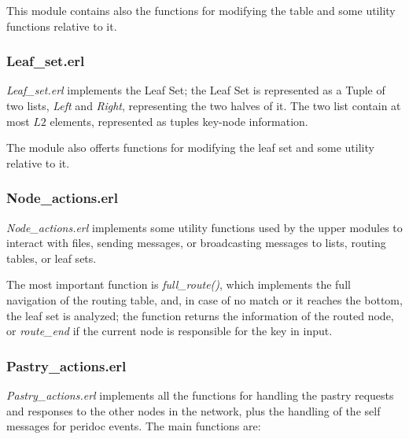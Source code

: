 \documentclass{article}
\begin{document}
This module contains also the functions for modifying the table and some utility functions relative to it.

\subsubsection{Leaf\_set.erl}

\textit{Leaf\_set.erl} implements the Leaf Set; the Leaf Set is represented as a Tuple of two lists, 
\textit{Left} and \textit{Right}, representing the two halves of it. The two list contain at most $L2$ elements, 
represented as tuples key-node information.


The module also offerts functions for modifying the leaf set and some utility relative to it.


\subsubsection{Node\_actions.erl}

\textit{Node\_actions.erl} implements some utility functions used by the upper modules to interact with files, 
sending messages, or broadcasting messages to lists, routing tables, or leaf sets.

The most important function is \textit{full\_route()}, which implements the full navigation of the routing table, 
and, in case of no match or it reaches the bottom, the leaf set is analyzed; the function returns the information
 of the routed node, or \textit{route\_end} if the current node is responsible for the key in input.


\subsubsection{Pastry\_actions.erl}

\textit{Pastry\_actions.erl} implements all the functions for handling the pastry requests and responses
to the other nodes in the network, plus the handling of the self messages for peridoc events.
The main functions are:
\end{document}
